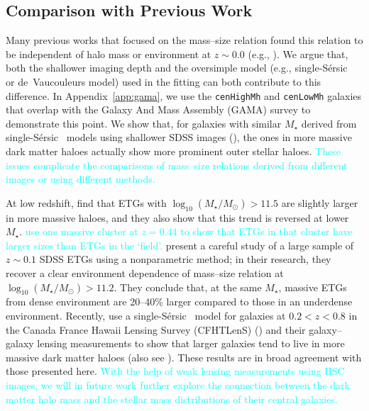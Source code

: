 \documentclass[a4paper,fleqn,usenatbib]{mnras}
\def\ser{{S\'{e}rsic\ }}
\def\rbcg{\texttt{cenHighMh}}
\def\nbcg{\texttt{cenLowMh}}
\def\mstar{{$M_{\star}$}}
\def\logms{{$\log_{10} (M_{\star}/M_{\odot})$}}
\newcommand{\song}[1]{\textcolor{cyan}{#1}}
\begin{document}
\subsection{Comparison with Previous Work} 

    Many previous works that focused on the mass--size relation found this relation 
    to be independent of halo mass or environment at $z\sim 0.0$ 
    (e.g., \citealt{Nair2010, Maltby2010, Cappellari2013, HCompany13}). 
    We argue that, both the shallower imaging depth and the oversimple model 
    (e.g., single-\ser{} or de~Vaucouleurs model) used in the fitting can both 
    contribute to this difference.
    In Appendix~\ref{app:gama}, we use the \rbcg{} and \nbcg{} galaxies that overlap 
    with the Galaxy And Mass Assembly (GAMA) survey to demonstrate this point. 
    We show that, for galaxies with similar \mstar{} derived from single-\ser{} 
    models using shallower SDSS images (\citealt{Kelvin2012}), the ones in more 
    massive dark matter haloes actually show more prominent outer stellar haloes.
    \song{
    These issues complicate the comparisons of mass--size relations derived from 
    different images or using different methods.
    }
    
    At low redshift, \citet{Cerbrian2014} find that ETGs with \logms{}$>11.5$ are 
    slightly larger in more massive haloes, and they also show that this trend is 
    reversed at lower \mstar{}. 
    \song{
    \citet{Kuchner2017} use one massive cluster at $z=0.44$ to show that ETGs in 
    that cluster have larger sizes than ETGs in the `field'. 
    }
    \citet{Yoon2017} present a careful study of a large sample of $z\sim0.1$ SDSS 
    ETGs using a nonparametric method; in their research, they recover a clear 
    environment dependence of mass--size relation at \logms{}$>11.2$. 
    They conclude that, at the same \mstar{}, massive ETGs from dense environment 
    are 20--40\% larger compared to those in an underdense environment.
    Recently, \citet{Charlton2017} use a single-\ser{} model for galaxies at 
    $0.2 < z < 0.8$ in the Canada France Hawaii Lensing Survey (CFHTLenS) 
    (\citealt{Heymans2012}) and their galaxy--galaxy 
    lensing measurements to show that larger galaxies tend to live in more massive 
    dark matter haloes (also see \citealt{Sonnenfeld2017}).
    These results are in broad agreement with those presented here.
    \song{
    With the help of weak lensing measurements using HSC images, we will in future 
    work further explore the connection between the dark matter halo mass and the 
    stellar mass distributions of their central galaxies. 
    }
    
\end{document}
